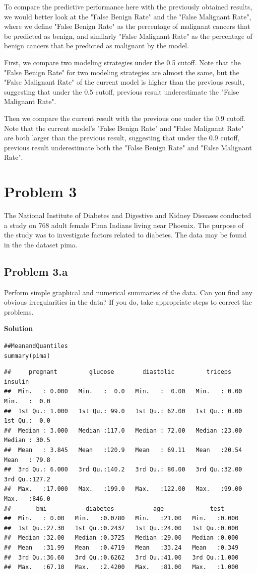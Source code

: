 \documentclass[12pt,oneside,a4paper]{article}\usepackage[]{graphicx}\usepackage[]{xcolor}
\makeatletter
\newcommand{\hlcom}[1]{\textcolor[rgb]{0.443,0.478,0.702}{#1}}%
\newcommand{\hlstd}[1]{\textcolor[rgb]{0,0,0}{#1}}%
\newcommand{\hlkwd}[1]{\textcolor[rgb]{0,0,0}{#1}}%
\newenvironment{kframe}{%
 \def\at@end@of@kframe{}%
 \ifinner\ifhmode%
  \def\at@end@of@kframe{\end{minipage}}%
  \begin{minipage}{\columnwidth}%
 \fi\fi%
 \def\FrameCommand##1{\hskip\@totalleftmargin \hskip-\fboxsep
 \colorbox{shadecolor}{##1}\hskip-\fboxsep
     \hskip-\linewidth \hskip-\@totalleftmargin \hskip\columnwidth}%
 \MakeFramed {\advance\hsize-\width
   \@totalleftmargin\z@ \linewidth\hsize
   \@setminipage}}%
 {\par\unskip\endMakeFramed%
 \at@end@of@kframe}
\newenvironment{knitrout}{}{} %
\newcommand{\problem}[1]
{
    \clearpage
    \section*{Problem {#1}}
}
\newcommand{\subproblem}[1]
{
    \subsection*{Problem {#1}}
}
\newcommand{\solution}
{
    \vspace{15pt}
    \noindent\ignorespaces\textbf{\large Solution}\par
}
\makeatother
\begin{document}
To compare the predictive performance here with the previously obtained results, we would better look at the "False Benign Rate" and the "False Malignant Rate", where we define "False Benign Rate" as the percentage of malignant cancers that be predicted as benign, and similarly "False Malignant Rate" as the percentage of benign cancers that be predicted as malignant by the model. 

First, we compare two modeling strategies under the 0.5 cutoff. Note that the "False Benign Rate" for two modeling strategies are almost the same, but the "False Malignant Rate" of the current model is higher than the previous result, suggesting that under the 0.5 cutoff, previous result underestimate the "False Malignant Rate".

Then we compare the current result with the previous one under the 0.9 cutoff. Note that the current model's "False Benign Rate" and "False Malignant Rate" are both larger than the previous result, suggesting that under the 0.9 cutoff, previous result underestimate both the "False Benign Rate" and "False Malignant Rate".

\problem{3}
The National Institute of Diabetes and Digestive and Kidney Diseases conducted a study on 768 adult female Pima Indians living near Phoenix. The purpose of the study was to investigate factors related to diabetes. The data may be found in the the dataset pima.

\subproblem{3.a}
Perform simple graphical and numerical summaries of the data. Can you find any obvious irregularities in the data? If you do, take appropriate steps to correct the problems.

\solution
\begin{knitrout}
\color{fgcolor}\begin{kframe}
\begin{alltt}
\hlcom{## Mean and Quantiles}
\hlkwd{summary}\hlstd{(pima)}
\end{alltt}
\begin{verbatim}
##     pregnant         glucose        diastolic         triceps         insulin     
##  Min.   : 0.000   Min.   :  0.0   Min.   :  0.00   Min.   : 0.00   Min.   :  0.0  
##  1st Qu.: 1.000   1st Qu.: 99.0   1st Qu.: 62.00   1st Qu.: 0.00   1st Qu.:  0.0  
##  Median : 3.000   Median :117.0   Median : 72.00   Median :23.00   Median : 30.5  
##  Mean   : 3.845   Mean   :120.9   Mean   : 69.11   Mean   :20.54   Mean   : 79.8  
##  3rd Qu.: 6.000   3rd Qu.:140.2   3rd Qu.: 80.00   3rd Qu.:32.00   3rd Qu.:127.2  
##  Max.   :17.000   Max.   :199.0   Max.   :122.00   Max.   :99.00   Max.   :846.0  
##       bmi           diabetes           age             test      
##  Min.   : 0.00   Min.   :0.0780   Min.   :21.00   Min.   :0.000  
##  1st Qu.:27.30   1st Qu.:0.2437   1st Qu.:24.00   1st Qu.:0.000  
##  Median :32.00   Median :0.3725   Median :29.00   Median :0.000  
##  Mean   :31.99   Mean   :0.4719   Mean   :33.24   Mean   :0.349  
##  3rd Qu.:36.60   3rd Qu.:0.6262   3rd Qu.:41.00   3rd Qu.:1.000  
##  Max.   :67.10   Max.   :2.4200   Max.   :81.00   Max.   :1.000
\end{verbatim}
\end{kframe}
\end{knitrout}
\end{document}
